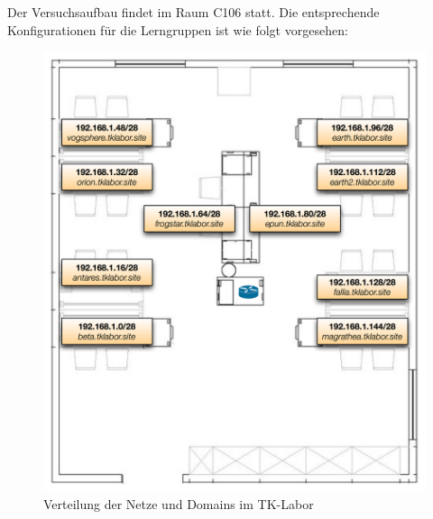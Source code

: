 Der Versuchsaufbau findet im Raum C106 statt. Die entsprechende
Konfigurationen für die Lerngruppen ist wie folgt vorgesehen:
\begin{figure}[H]
 	\centering
 		\includegraphics[width=1.0\textwidth]{images/lab-aufbau.png}
 		\caption{Verteilung der Netze und Domains im TK-Labor}
 	\label{fig:chap-labdocu-aufbau}
\end{figure}
